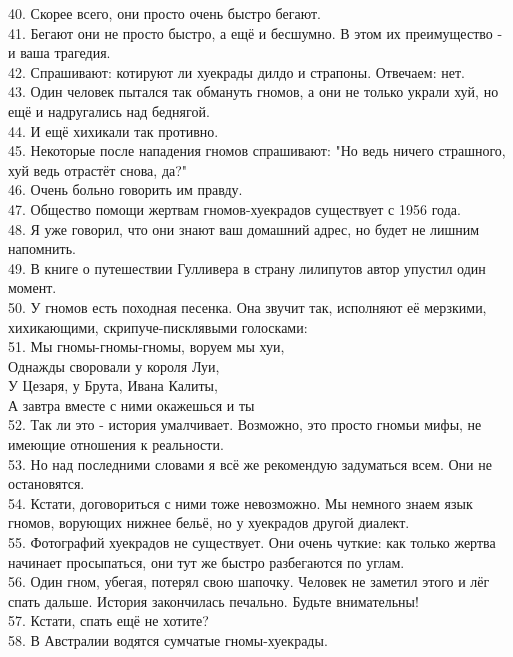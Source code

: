 \documentclass[a4paper,20pt,notitlepage]{extbook}
\begin{document}
	40. Скорее всего, они просто очень быстро бегают.\\
	41. Бегают они не просто быстро, а ещё и бесшумно. В этом их преимущество - и ваша трагедия.\\
	42. Спрашивают: котируют ли хуекрады дилдо и страпоны. Отвечаем: нет.\\
	43. Один человек пытался так обмануть гномов, а они не только украли хуй, но ещё и надругались над беднягой.\\
	44. И ещё хихикали так противно.\\
	45. Некоторые после нападения гномов спрашивают: "Но ведь ничего страшного, хуй ведь отрастёт снова, да?"\\
	46. Очень больно говорить им правду.\\
	47. Общество помощи жертвам гномов-хуекрадов существует с 1956 года.\\
	48. Я уже говорил, что они знают ваш домашний адрес, но будет не лишним напомнить.\\
	49. В книге о путешествии Гулливера в страну лилипутов автор упустил один момент.\\
	50. У гномов есть походная песенка. Она звучит так, исполняют её мерзкими, хихикающими, скрипуче-писклявыми голосками:\\
	51. Мы гномы-гномы-гномы, воруем мы хуи,\\
	Однажды своровали у короля Луи,\\
	У Цезаря, у Брута, Ивана Калиты,\\
	А завтра вместе с ними окажешься и ты\\
	52. Так ли это - история умалчивает. Возможно, это просто гномьи мифы, не имеющие отношения к реальности.\\
	53. Но над последними словами я всё же рекомендую задуматься всем. Они не остановятся.\\
	54. Кстати, договориться с ними тоже невозможно. Мы немного знаем язык гномов, ворующих нижнее бельё, но у хуекрадов другой диалект.\\
	55. Фотографий хуекрадов не существует. Они очень чуткие: как только жертва начинает просыпаться, они тут же быстро разбегаются по углам.\\
	56. Один гном, убегая, потерял свою шапочку. Человек не заметил этого и лёг спать дальше. История закончилась печально.
	Будьте внимательны!\\
	57. Кстати, спать ещё не хотите?\\
	58. В Австралии водятся сумчатые гномы-хуекрады.\\
\end{document}

